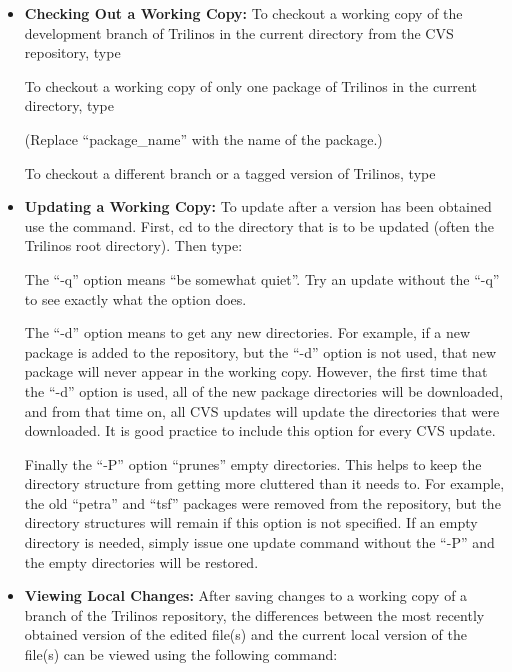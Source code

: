 \documentclass[12pt,relax]{TrilinosDevGuide}
\begin{document}
\begin{itemize}
\item {\bf Checking Out a Working Copy:}
To checkout a working copy of the development branch of Trilinos in the 
current directory from the CVS repository, type


To checkout a working copy of only one package of Trilinos in the 
current directory, type


(Replace ``package\_name'' with the name of the package.)

To checkout a different branch or a tagged version of Trilinos, type


\item {\bf Updating a Working Copy:}
To update after a version has been obtained use the  
command.  First, cd to the directory that is to be updated (often the 
Trilinos root directory).  Then type:


The ``-q'' option means ``be somewhat quiet''.  Try an update without the 
``-q'' to see exactly what the option does.  

The ``-d'' option means to get any new directories.  For example, if a new 
package is added to the repository, but the ``-d'' option is not used, that 
new package will never appear in the working copy.  However, the first time 
that the ``-d'' option is used, all of the new package directories will be 
downloaded, and from that time on, all CVS updates will update the 
directories that were downloaded.  It is good practice to include this 
option for every CVS update.

Finally the ``-P'' option ``prunes'' empty directories.  This helps to keep 
the directory structure from getting more cluttered than it needs to.  For 
example, the old ``petra'' and ``tsf'' packages were removed from the 
repository, but the directory structures will remain if this option is not 
specified.  If an empty directory is needed, simply issue one update 
command without the ``-P'' and the empty directories will be restored.

\item {\bf Viewing Local Changes:}
After saving changes to a working copy of a branch of the Trilinos repository, 
the differences between the most recently obtained version of the edited 
file(s) and the current local version of the file(s) can be viewed using the 
following command:


\end{itemize}
\end{document}
